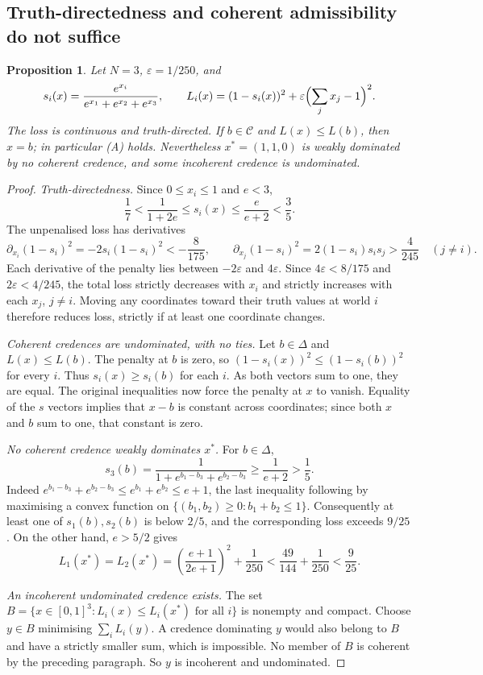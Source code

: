 \documentclass[11pt]{article}
\newtheorem{proposition}[theorem]{Proposition}
\theoremstyle{definition}
\theoremstyle{remark}
\newcommand{\C}{\mathcal C}
\begin{document}
\subsection{Truth-directedness and coherent admissibility do not suffice}
\begin{proposition}\label{prop:joyce-cex}
Let $N=3$, $\varepsilon=1/250$, and
\[
 s_i(x)=\frac{e^{x_i}}{e^{x_1}+e^{x_2}+e^{x_3}},\qquad
 L_i(x)=(1-s_i(x))^2+\varepsilon\Bigl(\sum_jx_j-1\Bigr)^2.
\]
The loss is continuous and truth-directed. If $b\in\C$ and $L(x)\le L(b)$, then $x=b$; in particular (A) holds. Nevertheless $x^*=(1,1,0)$ is weakly dominated by no coherent credence, and some incoherent credence is undominated.
\end{proposition}
\begin{proof}
\emph{Truth-directedness.} Since $0\le x_i\le1$ and $e<3$,
\[
 \frac17<\frac1{1+2e}\le s_i(x)\le\frac e{e+2}<\frac35.
\]
The unpenalised loss has derivatives
\[
 \partial_{x_i}(1-s_i)^2=-2s_i(1-s_i)^2<-\frac8{175},\qquad
 \partial_{x_j}(1-s_i)^2=2(1-s_i)s_is_j>\frac4{245}\quad(j\ne i).
\]
Each derivative of the penalty lies between $-2\varepsilon$ and $4\varepsilon$. Since $4\varepsilon<8/175$ and $2\varepsilon<4/245$, the total loss strictly decreases with $x_i$ and strictly increases with each $x_j$, $j\ne i$. Moving any coordinates toward their truth values at world $i$ therefore reduces loss, strictly if at least one coordinate changes.

\emph{Coherent credences are undominated, with no ties.} Let $b\in\Delta$ and $L(x)\le L(b)$. The penalty at $b$ is zero, so $(1-s_i(x))^2\le(1-s_i(b))^2$ for every $i$. Thus $s_i(x)\ge s_i(b)$ for each $i$. As both vectors sum to one, they are equal. The original inequalities now force the penalty at $x$ to vanish. Equality of the $s$ vectors implies that $x-b$ is constant across coordinates; since both $x$ and $b$ sum to one, that constant is zero.

\emph{No coherent credence weakly dominates $x^*$.} For $b\in\Delta$,
\[
 s_3(b)=\frac1{1+e^{b_1-b_3}+e^{b_2-b_3}}\ge\frac1{e+2}>\frac15.
\]
Indeed $e^{b_1-b_3}+e^{b_2-b_3}\le e^{b_1}+e^{b_2}\le e+1$, the last inequality following by maximising a convex function on $\{(b_1,b_2)\ge0:b_1+b_2\le1\}$. Consequently at least one of $s_1(b),s_2(b)$ is below $2/5$, and the corresponding loss exceeds $9/25$. On the other hand, $e>5/2$ gives
\[
 L_1(x^*)=L_2(x^*)=
 \left(\frac{e+1}{2e+1}\right)^2+\frac1{250}
 <\frac{49}{144}+\frac1{250}<\frac9{25}.
\]

\emph{An incoherent undominated credence exists.} The set $B=\{x\in[0,1]^3:L_i(x)\le L_i(x^*)\text{ for all }i\}$ is nonempty and compact. Choose $y\in B$ minimising $\sum_iL_i(y)$. A credence dominating $y$ would also belong to $B$ and have a strictly smaller sum, which is impossible. No member of $B$ is coherent by the preceding paragraph. So $y$ is incoherent and undominated.
\end{proof}
\end{document}
